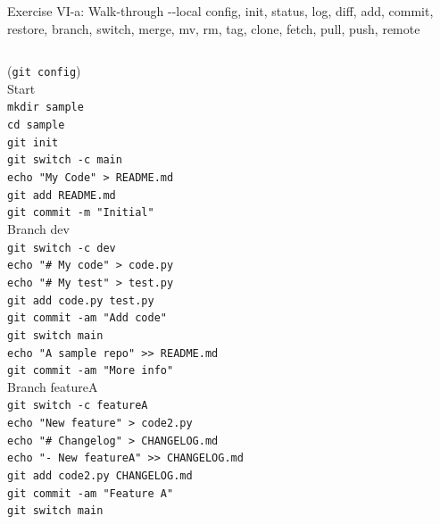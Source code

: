 \documentclass[aspectratio=169]{beamer}
\newcommand{\code}[1]{\texttt{\color{mygreen}#1}}
\begin{document}
\begin{frame}[t]
  {Exercise VI-a: Walk-through -{}-local}
  \tiny
  \vspace{-1.5em}
  config, init, status, log, diff,
  add, commit, restore,
  branch, switch, merge,
  mv, rm,
  tag,
  clone, fetch, pull, push,
  remote\\[2em]


  \begin{columns}[t]
    (\code{git config})\\[1em]

    Start\\
    \code{mkdir sample}\\
    \code{cd sample}\\
    \code{git init}\\
    \code{git switch -c main}\\
    \code{echo "My Code" > README.md}\\
    \code{git add README.md}\\
    \code{git commit -m "Initial"}\\[1em]

    Branch dev\\
    \code{git switch -c dev}\\
    \code{echo "\# My code" > code.py}\\
    \code{echo "\# My test" > test.py}\\
    \code{git add code.py test.py}\\
    \code{git commit -am "Add code"}\\
    \code{git switch main}\\
    \code{echo "A sample repo" >{}> README.md}\\
    \code{git commit -am "More info"}\\

    Branch featureA\\
    \code{git switch -c featureA}\\
    \code{echo "New feature" > code2.py}\\
    \code{echo "\# Changelog" > CHANGELOG.md}\\
    \code{echo "- New featureA" >{}> CHANGELOG.md}\\
    \code{git add code2.py CHANGELOG.md}\\
    \code{git commit -am "Feature A"}\\
    \code{git switch main}\\[1em]


\end{columns}
\end{frame}
\end{document}
